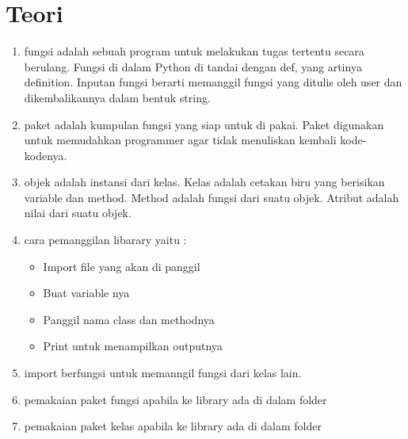 \section{Teori}
\begin{enumerate}

\item fungsi adalah sebuah program untuk melakukan tugas tertentu secara berulang. Fungsi di dalam Python di tandai dengan def, yang artinya definition.
Inputan fungsi berarti memanggil fungsi yang ditulis oleh user dan dikembalikannya dalam bentuk string.


\item paket adalah kumpulan fungsi yang siap untuk di pakai. Paket digunakan untuk memudahkan programmer agar tidak menuliskan kembali kode-kodenya.


\item objek adalah instansi dari kelas. Kelas adalah cetakan biru yang berisikan variable dan method. Method adalah fungsi dari suatu objek. Atribut adalah nilai dari suatu objek.


\item cara pemanggilan libarary yaitu :

\begin{itemize}

\item Import file yang akan di panggil
\item Buat variable nya
\item Panggil nama class dan methodnya
\item Print untuk menampilkan outputnya


\end{itemize}

\item import berfungsi untuk memanngil fungsi dari kelas lain.


\item pemakaian paket fungsi apabila ke library ada di dalam folder


\item pemakaian paket kelas apabila ke library ada di dalam folder

\end{enumerate}

